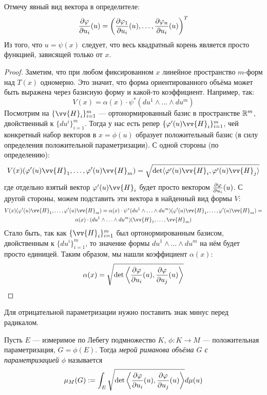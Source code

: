\begin{anote}
	Отмечу явный вид вектора в определителе:
	\[
		\frac{\partial \varphi}{\partial u_i}(u) = \left(\frac{\partial \varphi_1}{\partial u_i}(u), \ldots, \frac{\partial \varphi_n}{\partial u_i}(u)\right)^T
	\]
	Из того, что $u = \psi(x)$ следует, что весь квадратный корень является просто функцией, зависящей только от $x$.
\end{anote}

\begin{proof}
	Заметим, что при любом фиксированном $x$ линейное пространство $m$-форм над $T(x)$ одномерно. Это значит, что форма ориентированного объёма может быть выражена через базисную форму и какой-то коэффициент. Например, так:
	\[
		V(x) = \alpha(x) \cdot \psi^*(du^1 \wedge \ldots \wedge du^m)
	\]
	Посмотрим на $\{\vv{H}_i\}_{i = 1}^m$ --- ортонормированный базис в пространстве $\mathbb{R}^m$, двойственный к $\{du^i\}_{i = 1}^m$. Тогда у нас есть репер $\{\phi'(u)\vv{H}_i\}_{i = 1}^m$, чей конкретный набор векторов в $x = \phi(u)$ образует положительный базис (в силу определения положительной параметризации). С одной стороны (по определению):
	\[
		V(x)(\phi'(u)\vv{H}_1, \ldots, \phi'(u)\vv{H}_m) = \sqrt{\det\ntbr{\phi'(u)\vv{H}_i, \phi'(u)\vv{H}_j}}
	\]
	где отдельно взятый вектор $\phi'(u)\vv{H}_i$ будет просто вектором $\frac{\partial \varphi}{\partial u_i}(u)$. С другой стороны, можем подставить эти вектора в найденный вид формы $V$:
	\begin{multline*}
		V(x)(\phi'(u)\vv{H}_1, \ldots, \phi'(u)\vv{H}_m) = \alpha(x) \cdot \psi^*(du^1 \wedge \ldots \wedge du^m)(\phi'(u)\vv{H}_1, \ldots, \phi'(u)\vv{H}_m) =
		\\
		\alpha(x) \cdot (du^1 \wedge \ldots \wedge du^m)(\vv{H}_1, \ldots, \vv{H}_m)
	\end{multline*}
	Стало быть, так как $\{\vv{H}_i\}_{i = 1}^m$ был ортонормированным базисом, двойственным к $\{du^i\}_{i = 1}^m$, то значение формы $du^1 \wedge \ldots \wedge du^m$ на нём будет просто единицей. Таким образом, мы нашли коэффициент $\alpha(x)$:
	\[
		\alpha(x) = \sqrt{\det\left\langle\frac{\partial \varphi}{\partial u_i}(u), \frac{\partial \varphi}{\partial u_j}(u)\right\rangle}
	\]
\end{proof}

\begin{note}
	Для отрицательной параметризации нужно поставить знак минус перед радикалом.
\end{note}

\begin{definition}
	Пусть $E$ --- измеримое по Лебегу подмножество $K$, $\phi \colon K \to M$ --- положительная параметризация, $G = \phi(E)$. Тогда \textit{мерой риманова объёма $G$ с параметризацией $\phi$} называется
	\[
		\mu_M(G) := \int_{E} \sqrt{\det\left\langle\frac{\partial \varphi}{\partial u_i}(u), \frac{\partial \varphi}{\partial u_j}(u)\right\rangle} d\mu(u)
	\]
\end{definition}

